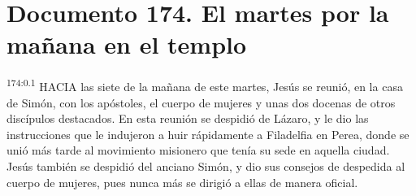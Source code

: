 \chapter{Documento 174. El martes por la mañana en el templo}
\par
\textsuperscript{174:0.1} HACIA las siete de la mañana de este martes, Jesús se reunió, en la casa de Simón, con los apóstoles, el cuerpo de mujeres y unas dos docenas de otros discípulos destacados. En esta reunión se despidió de Lázaro, y le dio las instrucciones que le indujeron a huir rápidamente a Filadelfia en Perea, donde se unió más tarde al movimiento misionero que tenía su sede en aquella ciudad. Jesús también se despidió del anciano Simón, y dio sus consejos de despedida al cuerpo de mujeres, pues nunca más se dirigió a ellas de manera oficial.

